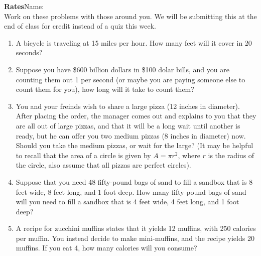 \documentclass{article}
\begin{document}
{\large\bf Rates}\hfill Name: \underline{\hspace{2in}}\\

Work on these problems with those around you. We will be submitting this at the
end of class for credit instead of a quiz this week. 

\begin{enumerate}
\item A bicycle is traveling at 15 miles per hour. How many feet will it cover
in 20 seconds? 

\vfill

\item Suppose you have \$600 billion dollars in \$100 dolar bills, and you are
counting them out 1 per second (or maybe you are paying someone else to count
them for you), how long will it take to count them? 

\vfill\newpage

\item You and your freinds wish to share a large pizza (12 inches in diameter). 
After placing the order, the manager comes out and explains to you that 
they are all out of large pizzas, and that it will be a long wait until 
another is ready, but he can offer you two medium pizzas (8 inches in 
diameter) now. Should you take the medium pizzas, or wait for the large? 
(It may be helpful to recall that the area of a circle is given by $A=\pi r^2$,
where $r$ is the radius of the circle, also assume that all pizzas are perfect
circles).

\vfill

\item Suppose that you need 48 fifty-pound bags of sand to fill a sandbox that
is 8 feet wide, 8 feet long, and 1 foot deep. How many fifty-pound bags of sand
will you need to fill a sandbox that is 4 feet wide, 4 feet long, and 1 foot
deep?

\vfill

\item A recipe for zucchini muffins states that it yields 12 muffins, with 
250 calories per muffin.  You instead decide to make mini-muffins, and the 
recipe yields 20 muffins. If you eat 4, how many calories will you consume?

\vfill

\end{enumerate}
\end{document}
